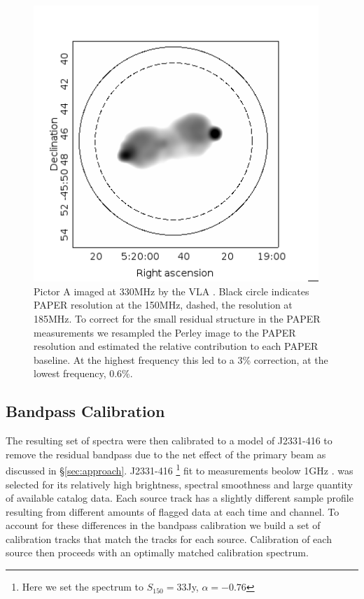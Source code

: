 \documentclass[preprint]{aastex}
\begin{document}
\begin{figure}
\includegraphics[width=0.96\textwidth]{plots/picA_Perley.png}
\caption{
Pictor A imaged at 330MHz by the VLA \citep{Perley:1997p9312}. Black circle
indicates PAPER resolution at the 150MHz, dashed, the resolution at 185MHz.  To
correct for the small residual structure in the PAPER measurements we resampled
the Perley image to the PAPER resolution and estimated the relative contribution
 to each PAPER baseline.  At the highest frequency this
led to a 3\% correction, at the lowest frequency, 0.6\%.
\label{fig:pic_perley}}
\end{figure}

\subsection{Bandpass Calibration}
\label{sec:Calibration}

The resulting set of spectra were then calibrated to a model of J2331-416 to remove 
the residual bandpass due to the net effect of the primary beam as discussed in \S \ref{sec:approach}. J2331-416 
\footnote{Here we set the spectrum to $S_{150}=33$Jy, $\alpha=-0.76$} fit to measurements beolow 1GHz \citep{slee1995,kuhr_et_al1981,large_et_al1981,burgess_hunstead2006}.
was selected for its relatively high brightness, spectral smoothness and large quantity
 of available catalog data. Each source track has a slightly different sample profile
 resulting from different amounts of flagged data at each time and channel. To account
 for these differences in the bandpass calibration we build a set of calibration tracks 
 that match the tracks for each source. Calibration of each source then proceeds with
 an optimally matched calibration spectrum.
\end{document}
